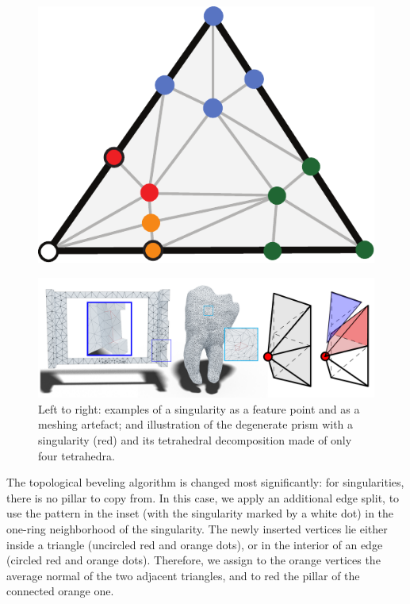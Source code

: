 \begin{figure}
    \includegraphics[width=1\linewidth]{prism-tex/figs/singular_bevel}
\end{figure}

\begin{figure}
\centering
\includegraphics[width=\linewidth]{prism-tex/figs/degenerate_prism_decompose}
\caption{Left to right: examples of a singularity as a feature point and as a meshing artefact; and illustration of the degenerate prism with a singularity (red) and its tetrahedral decomposition made of only four tetrahedra.}
\label{prism:fig:singularity-illustration}

\end{figure}

The topological beveling algorithm is changed most significantly: for singularities, there is no pillar to copy from.
In this case, we apply an additional edge split, to use the pattern in the inset (with the singularity marked by a white dot) in the one-ring neighborhood of the singularity.
The newly inserted vertices lie either inside a triangle (uncircled red and orange dots), 
or in the interior of an edge (circled red and orange dots).
Therefore, we assign to the orange vertices the average normal of the two adjacent triangles, and to red the pillar of the connected orange one.


